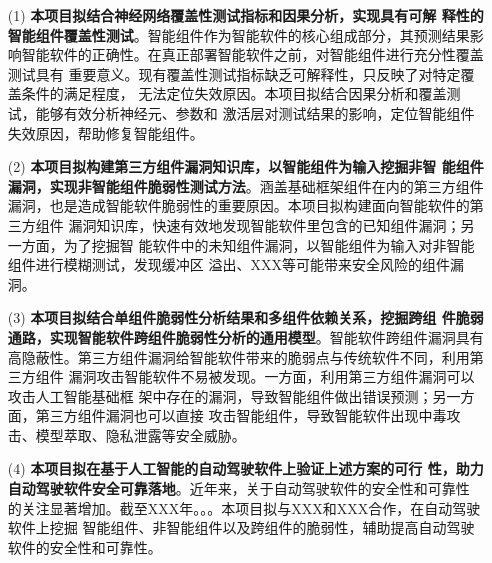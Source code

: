 \begin{itemize}
    \item[(1)]\textbf{本项目拟结合神经网络覆盖性测试指标和因果分析，实现具有可解
    释性的智能组件覆盖性测试}。智能组件作为智能软件的核心组成部分，其预测结果影
    响智能软件的正确性。在真正部署智能软件之前，对智能组件进行充分性覆盖测试具有
    重要意义。现有覆盖性测试指标缺乏可解释性，只反映了对特定覆盖条件的满足程度，
    无法定位失效原因。本项目拟结合因果分析和覆盖测试，能够有效分析神经元、参数和
    激活层对测试结果的影响，定位智能组件失效原因，帮助修复智能组件。
    \item[(2)]\textbf{本项目拟构建第三方组件漏洞知识库，以智能组件为输入挖掘非智
    能组件漏洞，实现非智能组件脆弱性测试方法}。涵盖基础框架组件在内的第三方组件
    漏洞，也是造成智能软件脆弱性的重要原因。本项目拟构建面向智能软件的第三方组件
    漏洞知识库，快速有效地发现智能软件里包含的已知组件漏洞；另一方面，为了挖掘智
    能软件中的未知组件漏洞，以智能组件为输入对非智能组件进行模糊测试，发现缓冲区
    溢出、XXX等可能带来安全风险的组件漏洞。
    \item[(3)]\textbf{本项目拟结合单组件脆弱性分析结果和多组件依赖关系，挖掘跨组
    件脆弱通路，实现智能软件跨组件脆弱性分析的通用模型}。智能软件跨组件漏洞具有
    高隐蔽性。第三方组件漏洞给智能软件带来的脆弱点与传统软件不同，利用第三方组件
    漏洞攻击智能软件不易被发现。一方面，利用第三方组件漏洞可以攻击人工智能基础框
    架中存在的漏洞，导致智能组件做出错误预测；另一方面，第三方组件漏洞也可以直接
    攻击智能组件，导致智能软件出现中毒攻击、模型萃取、隐私泄露等安全威胁。
    \item[(4)]\textbf{本项目拟在基于人工智能的自动驾驶软件上验证上述方案的可行
    性，助力自动驾驶软件安全可靠落地}。近年来，关于自动驾驶软件的安全性和可靠性
    的关注显著增加。截至XXX年。。。本项目拟与XXX和XXX合作，在自动驾驶软件上挖掘
    智能组件、非智能组件以及跨组件的脆弱性，辅助提高自动驾驶软件的安全性和可靠性。
\end{itemize}


